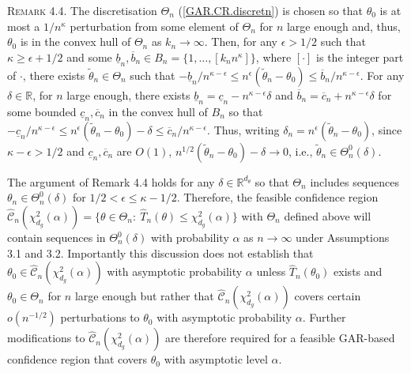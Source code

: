 \documentclass[hidelinks, 11 pt, a4paper, pdflatex]{article}
\begin{document}
{   \textsc{Remark 4.4}. The discretisation $\Theta_{n}$ (\ref{GAR.CR.discretn}) is chosen so that $\theta_{0}$ is at most a $1/n^{\kappa}$ perturbation from some element of $\Theta_{n}$
    for $n$ large enough and, thus, $\theta_{0}$ is in the convex hull of $\Theta_{n}$ as $k_{n} \rightarrow \infty$. Then, for any $\epsilon > 1/2$ such that $\kappa \geq \epsilon + 1/2$ and some $\underline{b}_{n},\overline{b}_{n} \in B_{n} = \{1,\ldots,[k_{n}n^{\kappa}]\}$, where $[\cdot]$ is the integer part of $\cdot$, there exists $\tilde{\theta}_{n} \in \Theta_{n}$ such that $-\underline{b}_{n}/n^{\kappa - \epsilon} \leq n^{\epsilon} (\tilde{\theta}_{n} - \theta _{0}) \leq \overline{b}_{n}/n^{\kappa - \epsilon}$. For any $\delta \in \mathbb{R}$, for $n$ large enough, there exists $\underline{b}_{n} = \underline{c}_{n} - n^{\kappa -\epsilon}\delta$ and $\overline{b}_{n} = \overline{c}_{n} + n^{\kappa -\epsilon}\delta$ for some bounded $\underline{c}_{n},\overline{c}_{n}$ in the convex hull of $B_{n}$ so that $-\underline{c}_{n}/n^{\kappa -\epsilon}\leq n^{\epsilon} (\tilde{\theta}_{n} - \theta _{0}) - \delta \leq \overline{c}_{n}/n^{\kappa - \epsilon}$. Thus, writing $\delta_{n} = n^{\epsilon} (\tilde{\theta}_{n} - \theta_{0})$, since $\kappa - \epsilon > 1/2$ and $\underline{c}_{n},\overline{c}_{n}$ are $O(1)$, $n^{1/2}(\tilde{\theta}_{n} - \theta _{0}) - \delta \rightarrow 0$, i.e., $\tilde{\theta}_{n} \in \Theta_{n}^{0}(\delta)$.

  The argument of Remark 4.4 holds for any $\delta \in \mathbb{R}^{d_{\theta}}$ so that $\Theta_{n}$ includes sequences $\theta_{n} \in \Theta_{n}^{0}(\delta)$ for $1/2 < \epsilon \leq \kappa - 1/2$. Therefore, the feasible confidence region $\hat{\mathcal{C}}_{n}(\chi_{d_{g}}^{2}(\alpha)) = \{\theta \in \Theta_{n}:~\hat{T}_{n}(\theta) \leq \chi_{d_g}^{2}(\alpha)\}$ with $\Theta_{n}$ defined above will contain sequences in $\Theta_{n}^{0}(\delta)$ with probability $\alpha$ as $n \rightarrow \infty$ under Assumptions 3.1 and 3.2. Importantly this discussion does not establish that $\theta_{0} \in \hat{\mathcal{C}}_{n}(\chi_{d_{g}}^{2}(\alpha))$ with asymptotic probability $\alpha$ unless $\hat{T}_{n}(\theta_{0})$ exists and $\theta_{0} \in \Theta_{n}$ for $n$ large enough but rather that $\hat{\mathcal{C}}_{n}(\chi_{d_{g}}^{2}(\alpha))$ covers certain $o(n^{-1/2})$ perturbations to $\theta_{0}$ with asymptotic probability $\alpha$. Further modifications to $\hat{\mathcal{C}}_{n}(\chi_{d_{g}}^{2}(\alpha))$ are therefore required for a feasible GAR-based confidence region that covers $\theta_{0}$ with asymptotic level $\alpha$.

}
\end{document}
